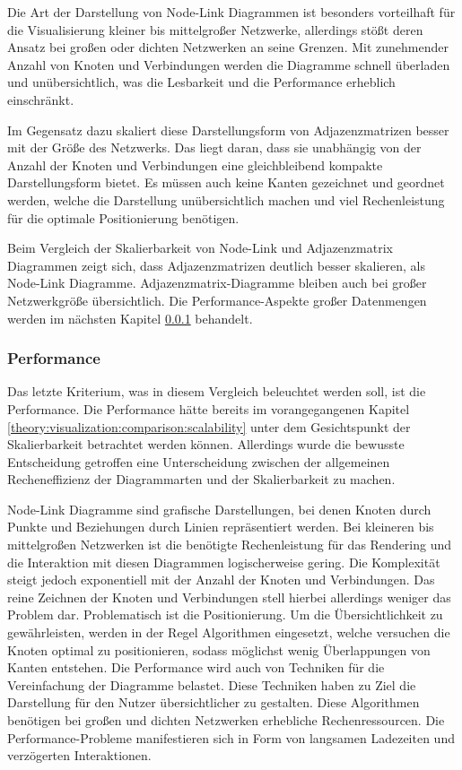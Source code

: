 Die Art der Darstellung von Node-Link Diagrammen ist besonders vorteilhaft für die Visualisierung kleiner bis mittelgroßer Netzwerke, allerdings stößt deren Ansatz bei großen oder dichten Netzwerken an seine Grenzen. Mit zunehmender Anzahl von Knoten und Verbindungen werden die Diagramme schnell überladen und unübersichtlich, was die Lesbarkeit und die Performance erheblich einschränkt.

Im Gegensatz dazu skaliert diese Darstellungsform von Adjazenzmatrizen besser mit der Größe des Netzwerks. Das liegt daran, dass sie unabhängig von der Anzahl der Knoten und Verbindungen eine gleichbleibend kompakte Darstellungsform bietet. Es müssen auch keine Kanten gezeichnet und geordnet werden, welche die Darstellung unübersichtlich machen und viel Rechenleistung für die optimale Positionierung benötigen.

Beim Vergleich der Skalierbarkeit von Node-Link und Adjazenzmatrix Diagrammen zeigt sich, dass Adjazenzmatrizen deutlich besser skalieren, als Node-Link Diagramme. Adjazenzmatrix-Diagramme bleiben auch bei großer Netzwerkgröße übersichtlich. Die Performance-Aspekte großer Datenmengen werden im nächsten Kapitel \ref{theory:visualization:comparison:performance} behandelt.

\subsubsection{Performance}
\label{theory:visualization:comparison:performance}

Das letzte Kriterium, was in diesem Vergleich beleuchtet werden soll, ist die Performance. Die Performance hätte bereits im vorangegangenen Kapitel \ref{theory:visualization:comparison:scalability} unter dem Gesichtspunkt der Skalierbarkeit betrachtet werden können. Allerdings wurde die bewusste Entscheidung getroffen eine Unterscheidung zwischen der allgemeinen Recheneffizienz der Diagrammarten und der Skalierbarkeit zu machen.

Node-Link Diagramme sind grafische Darstellungen, bei denen Knoten durch Punkte und Beziehungen durch Linien repräsentiert werden. Bei kleineren bis mittelgroßen Netzwerken ist die benötigte Rechenleistung für das Rendering und die Interaktion mit diesen Diagrammen logischerweise gering. Die Komplexität steigt jedoch exponentiell mit der Anzahl der Knoten und Verbindungen. Das reine Zeichnen der Knoten und Verbindungen stell hierbei allerdings weniger das Problem dar. Problematisch ist die Positionierung. Um die Übersichtlichkeit zu gewährleisten, werden in der Regel Algorithmen eingesetzt, welche versuchen die Knoten optimal zu positionieren, sodass möglichst wenig Überlappungen von Kanten entstehen. Die Performance wird auch von Techniken für die Vereinfachung der Diagramme belastet. Diese Techniken haben zu Ziel die Darstellung für den Nutzer übersichtlicher zu gestalten.  Diese Algorithmen benötigen bei großen und dichten Netzwerken erhebliche Rechenressourcen. Die Performance-Probleme manifestieren sich in Form von langsamen Ladezeiten und verzögerten Interaktionen.

